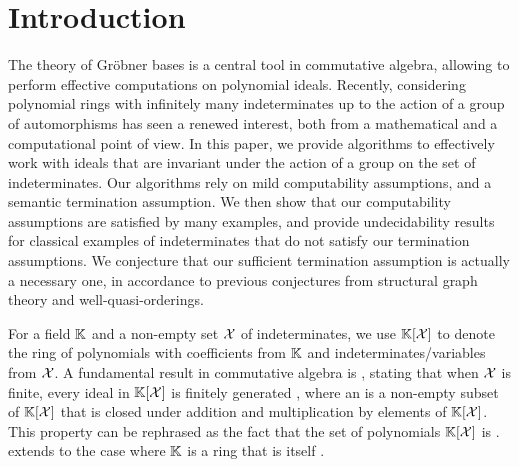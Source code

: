 \section{Introduction}
\label{sec:intro}


The theory of Gröbner bases is a central tool in commutative algebra,
allowing to perform effective computations on polynomial ideals. Recently,
considering polynomial rings with infinitely many indeterminates up to the
action of a group of automorphisms has seen a renewed interest, both from a
mathematical and a computational point of view. In this paper, we provide
algorithms to effectively work with ideals that are invariant under the action
of a group on the set of indeterminates. Our algorithms rely on mild
computability assumptions, and a semantic termination assumption. We then show
that our computability assumptions are satisfied by many examples, and provide
undecidability results for classical examples of indeterminates that do not
satisfy our termination assumptions. We conjecture that our sufficient
termination assumption is actually a necessary one, in accordance to previous
conjectures from structural graph theory and well-quasi-orderings.

\AP For a field $\mathbb{K}$ and a non-empty set $\mathcal{X}$ of indeterminates, we use
$\mathbb{K}[\mathcal{X}]$ to denote the ring of polynomials with coefficients from $\mathbb{K}$
and indeterminates/variables from $\mathcal{X}$. A fundamental result in commutative
algebra is , stating that when $\mathcal{X}$ is finite,
every ideal in $\mathbb{K}[\mathcal{X}]$ is finitely generated \cite{HILB1890}, where an
 is a non-empty subset of $\mathbb{K}[\mathcal{X}]$ that is closed under
addition and multiplication by elements of $\mathbb{K}[\mathcal{X}]$. This property can
be rephrased as the fact that the set of polynomials $\mathbb{K}[\mathcal{X}]$ is
.  extends to the case where $\mathbb{K}$
is a ring that is itself  \cite[Theorem 4.1]{Lang02}.

